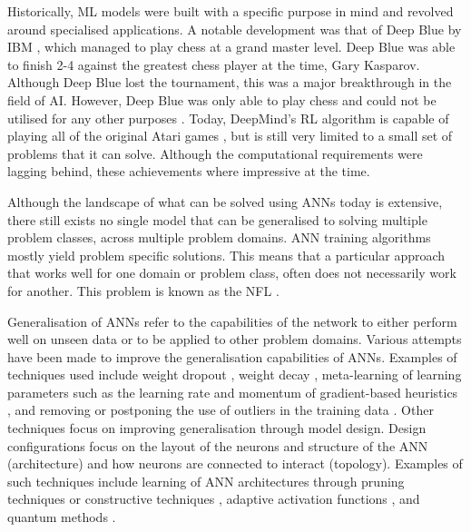 Historically, \ac{ML} models were built with a specific purpose in mind and revolved around specialised applications. A notable development was that of Deep Blue by IBM \cite{ref:keene:1996}, which managed to play chess at a grand master level. Deep Blue was able to finish 2-4 against the greatest chess player at the time, Gary Kasparov. Although Deep Blue lost the tournament, this was a major breakthrough in the field of \ac{AI}. However, Deep Blue was only able to play chess and could not be utilised for any other purposes \cite{ref:kelley:2010}. Today, DeepMind's \ac{RL} algorithm is capable of playing all of the original Atari games \cite{ref:mnih:2013}, but is still very limited to a small set of problems that it can solve. Although the computational requirements were lagging behind, these achievements where impressive at the time.

Although the landscape of what can be solved using \acp{ANN} today is extensive, there still exists no single model that can be generalised to solving multiple problem classes, across multiple problem domains. \acs{ANN} training algorithms mostly yield problem specific solutions. This means that a particular approach that works well for one domain or problem class, often does not necessarily work for another. This problem is known as the \ac{NFL} \cite{ref:wolpert:1997}.

Generalisation of \acp{ANN} refer to the capabilities of the network to either perform well on unseen data or to be applied to other problem domains. Various attempts have been made to improve the generalisation capabilities of \acp{ANN}. Examples of techniques used include weight dropout \cite{ref:srivastava:2014}, weight decay \cite{ref:krogh:1992}, meta-learning of learning parameters such as the learning rate and momentum of gradient-based heuristics \cite{ref:zeiler:2012, ref:lv:2017, ref:darken:1992}, and removing or postponing the use of outliers in the training data \cite{ref:reeves:1998}. Other techniques focus on improving generalisation through model design. Design configurations focus on the layout of the neurons and structure of the \acs{ANN} (architecture) and how neurons are connected to interact (topology). Examples of such techniques include learning of \ac{ANN} architectures through pruning techniques \cite{ref:cibas:1996, ref:engelbrecht:1996} or constructive techniques \cite{ref:hassibi:1994, ref:lecun:1990}, adaptive activation functions \cite{ref:engelbrecht:1995, ref:fletcher:1994}, and quantum methods \cite{ref:wan:2017, ref:ricks:2004}.

